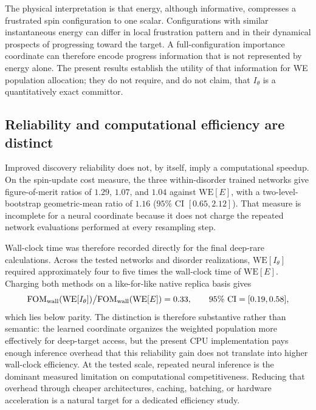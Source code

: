 \documentclass[a4paper,fleqn]{cas-sc}
\newcommand{\WE}{\mathrm{WE}}
\newcommand{\FOM}{\mathrm{FOM}}
\begin{document}
The physical interpretation is that energy, although informative, compresses a frustrated spin
configuration to one scalar. Configurations with similar instantaneous energy can differ in
local frustration pattern and in their dynamical prospects of progressing toward the target.
A full-configuration importance coordinate can therefore encode progress information that is
not represented by energy alone. The present results establish the utility of that information
for WE population allocation; they do not require, and do not claim, that $I_\theta$ is a
quantitatively exact committor.

\subsection{Reliability and computational efficiency are distinct}\label{sec:costdisc}
Improved discovery reliability does not, by itself, imply a computational speedup. On the
spin-update cost measure, the three within-disorder trained networks give figure-of-merit ratios
of $1.29$, $1.07$, and $1.04$ against $\WE[E]$, with a two-level-bootstrap geometric-mean ratio
of $1.16$ ($95\%$ CI $[0.65,2.12]$). That measure is incomplete for a neural coordinate because
it does not charge the repeated network evaluations performed at every resampling step.

Wall-clock time was therefore recorded directly for the final deep-rare calculations. Across
the tested networks and disorder realizations, $\WE[I_\theta]$ required approximately four to
five times the wall-clock time of $\WE[E]$. Charging both methods on a like-for-like native
replica basis gives
\begin{equation}
\FOM_{\rm wall}(\WE[I_\theta])\big/\FOM_{\rm wall}(\WE[E]) = 0.33,
\qquad 95\%\ \mathrm{CI}=[0.19,0.58],
\label{eq:fomwall}
\end{equation}
which lies below parity. The distinction is therefore substantive rather than semantic: the
learned coordinate organizes the weighted population more effectively for deep-target access,
but the present CPU implementation pays enough inference overhead that this reliability gain
does not translate into higher wall-clock efficiency. At the tested scale, repeated neural
inference is the dominant measured limitation on computational competitiveness. Reducing that
overhead through cheaper architectures, caching, batching, or hardware acceleration is a
natural target for a dedicated efficiency study.
\end{document}
